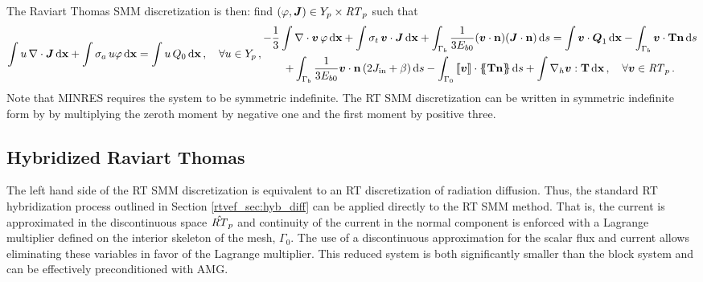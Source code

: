 \documentclass[../doc.tex]{subfiles}
\begin{document}
The Raviart Thomas SMM discretization is then: find $(\varphi,\boldsymbol{J}) \in Y_p \times \mathit{RT}_p$ such that 
	\begin{subequations}
	\begin{equation}
		\int u\,\nabla\cdot\vec{J} \ud \x + \int \sigma_a\, u \varphi \ud \x = \int u\, Q_0 \ud \x \,, \quad \forall u \in Y_p \,, 
	\end{equation}\vspace{-.75cm}
	\begin{multline}
		-\frac{1}{3}\int \nabla\cdot\vec{v}\, \varphi \ud \x + \int\sigma_t\, \vec{v}\cdot\vec{J} \ud \x + \int_{\Gamma_b} \frac{1}{3E_{b0}}(\vec{v}\cdot\n)(\vec{J}\cdot\n) \ud s = \int \vec{v}\cdot\Qone \ud \x - \int_{\Gamma_b} \vec{v}\cdot\T\n \ud s \\
		+\int_{\Gamma_b} \frac{1}{3E_{b0}}\vec{v}\cdot\n\paren{2\Jin + \beta} \ud s - \int_{\Gamma_0} \jump{\vec{v}}\cdot\avg{\T\n} \ud s + \int \nablah \vec{v} : \T \ud \x \,, \quad \forall \vec{v} \in \RT_p \,. 
	\end{multline}
	\end{subequations}
Note that MINRES requires the system to be symmetric indefinite. The RT SMM discretization can be written in symmetric indefinite form by by multiplying the zeroth moment by negative one and the first moment by positive three. 

\subsection{Hybridized Raviart Thomas}
The left hand side of the RT SMM discretization is equivalent to an RT discretization of radiation diffusion. Thus, the standard RT hybridization process outlined in Section \ref{rtvef_sec:hyb_diff} can be applied directly to the RT SMM method. That is, the current is approximated in the discontinuous space $\hat{\mathit{RT}}_p$ and continuity of the current in the normal component is enforced with a Lagrange multiplier defined on the interior skeleton of the mesh, $\Gamma_0$. The use of a discontinuous approximation for the scalar flux and current allows eliminating these variables in favor of the Lagrange multiplier. This reduced system is both significantly smaller than the block system and can be effectively preconditioned with AMG. 
\end{document}
